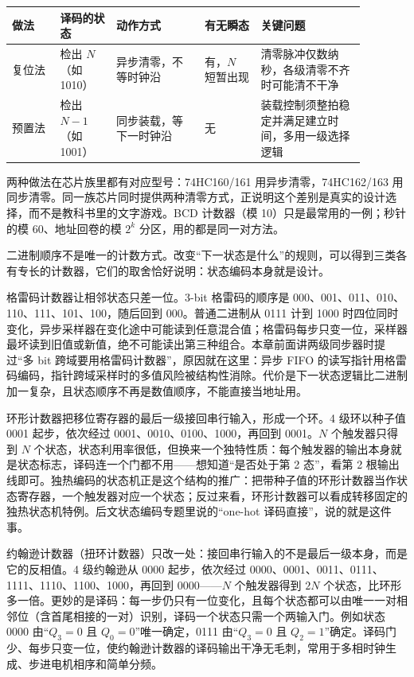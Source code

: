 \begin{longtable}{L{0.12\linewidth}L{0.14\linewidth}L{0.22\linewidth}L{0.14\linewidth}L{0.26\linewidth}}
\toprule
做法 & 译码的状态 & 动作方式 & 有无瞬态 & 关键问题 \\
\midrule
复位法 & 检出 $N$（如 1010） & 异步清零，不等时钟沿 & 有，$N$ 短暂出现 & 清零脉冲仅数纳秒，各级清零不齐时可能清不干净 \\\tablerowrule
预置法 & 检出 $N-1$（如 1001） & 同步装载，等下一时钟沿 & 无 & 装载控制须整拍稳定并满足建立时间，多用一级选择逻辑 \\
\bottomrule
\end{longtable}

两种做法在芯片族里都有对应型号：74HC160/161 用异步清零，74HC162/163 用同步清零。同一族芯片同时提供两种清零方式，正说明这个差别是真实的设计选择，而不是教科书里的文字游戏。BCD 计数器（模 10）只是最常用的一例；秒针的模 60、地址回卷的模 $2^k$ 分区，用的都是同一对方法。


二进制顺序不是唯一的计数方式。改变“下一状态是什么”的规则，可以得到三类各有专长的计数器，它们的取舍恰好说明：状态编码本身就是设计。

格雷码计数器让相邻状态只差一位。3-bit 格雷码的顺序是 000、001、011、010、110、111、101、100，随后回到 000。普通二进制从 0111 计到 1000 时四位同时变化，异步采样器在变化途中可能读到任意混合值；格雷码每步只变一位，采样器最坏读到旧值或新值，绝不可能读出第三种组合。本章前面讲两级同步器时提过“多 bit 跨域要用格雷码计数器”，原因就在这里：异步 FIFO 的读写指针用格雷码编码，指针跨域采样时的多值风险被结构性消除。代价是下一状态逻辑比二进制加一复杂，且状态顺序不再是数值顺序，不能直接当地址用。

环形计数器把移位寄存器的最后一级接回串行输入，形成一个环。4 级环以种子值 0001 起步，依次经过 0001、0010、0100、1000，再回到 0001。$N$ 个触发器只得到 $N$ 个状态，状态利用率很低，但换来一个独特性质：每个触发器的输出本身就是状态标志，译码连一个门都不用——想知道“是否处于第 2 态”，看第 2 根输出线即可。独热编码的状态机正是这个结构的推广：把带种子值的环形计数器当作状态寄存器，一个触发器对应一个状态；反过来看，环形计数器可以看成转移固定的独热状态机特例。后文状态编码专题里说的“one-hot 译码直接”，说的就是这件事。

约翰逊计数器（扭环计数器）只改一处：接回串行输入的不是最后一级本身，而是它的反相值。4 级约翰逊从 0000 起步，依次经过 0000、0001、0011、0111、1111、1110、1100、1000，再回到 0000——$N$ 个触发器得到 $2N$ 个状态，比环形多一倍。更妙的是译码：每一步仍只有一位变化，且每个状态都可以由唯一一对相邻位（含首尾相接的一对）识别，译码一个状态只需一个两输入门。例如状态 0000 由“$Q_3=0$ 且 $Q_0=0$”唯一确定，0111 由“$Q_3=0$ 且 $Q_2=1$”确定。译码门少、每步只变一位，使约翰逊计数器的译码输出干净无毛刺，常用于多相时钟生成、步进电机相序和简单分频。

